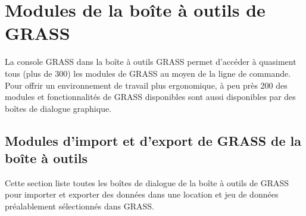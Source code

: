 \section{Modules de la bo\^ite \`a outils de GRASS }\label{appdx_grass_toolbox_modules}


La console GRASS dans la bo\^ite \`a outils GRASS permet d'acc\'eder \`a quasiment tous (plus de 300) les modules de GRASS au moyen de la ligne de commande. Pour offrir un environnement de travail plus ergonomique, \`a peu pr\`es 200 des modules et fonctionnalit\'es de GRASS disponibles sont aussi disponibles par des bo\^ites de dialogue graphique.

\subsection{Modules d'import et d'export de GRASS de la bo\^ite \`a outils}

Cette section liste toutes les bo\^ites de dialogue de la bo\^ite \`a outils de GRASS pour importer et exporter des donn\'ees dans une location et jeu de donn\'ees pr\'ealablement s\'electionn\'es dans GRASS.

